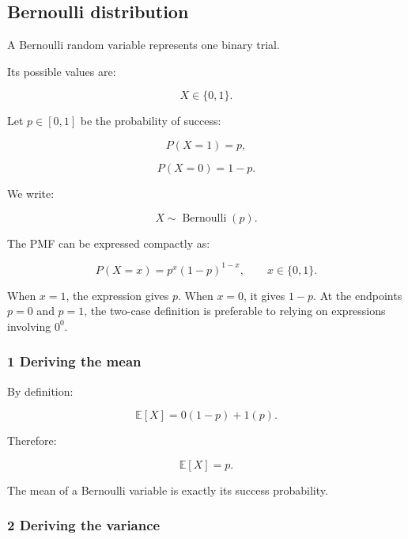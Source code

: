 \hypertarget{02-foundations-ii-ch023-discrete-and-continuous-distribution-families}{}

\subsection{Bernoulli distribution}\label{02-foundations-ii-ch023-bernoulli-distribution}

\hypertarget{02-foundations-ii-ch023-bernoulli-distribution}{}

A Bernoulli random variable represents one binary trial.

Its possible values are:

\[
 X\in\{0,1\}.
\]

Let \(p\in[0,1]\) be the probability of success:

\[
 P(X=1)=p,
\]

\[
 P(X=0)=1-p.
\]

We write:

\[
 \boxed{X\sim\operatorname{Bernoulli}(p)}.
\]

The PMF can be expressed compactly as:

\[
 \boxed{ P(X=x)=p^x(1-p)^{1-x}, \qquad x\in\{0,1\} }.
\]

When \(x=1\), the expression gives \(p\). When \(x=0\), it gives \(1-p\). At the endpoints \(p=0\) and \(p=1\), the two-case definition is preferable to relying on expressions involving \(0^0\).

\subsubsection{1 Deriving the mean}\label{02-foundations-ii-ch023-deriving-the-mean}

\hypertarget{02-foundations-ii-ch023-deriving-the-mean}{}

By definition:

\[
 \mathbb E[X] = 0(1-p)+1(p).
\]

Therefore:

\[
 \boxed{\mathbb E[X]=p}.
\]

The mean of a Bernoulli variable is exactly its success probability.

\subsubsection{2 Deriving the variance}\label{02-foundations-ii-ch023-deriving-the-variance}

\hypertarget{02-foundations-ii-ch023-deriving-the-variance}{}

